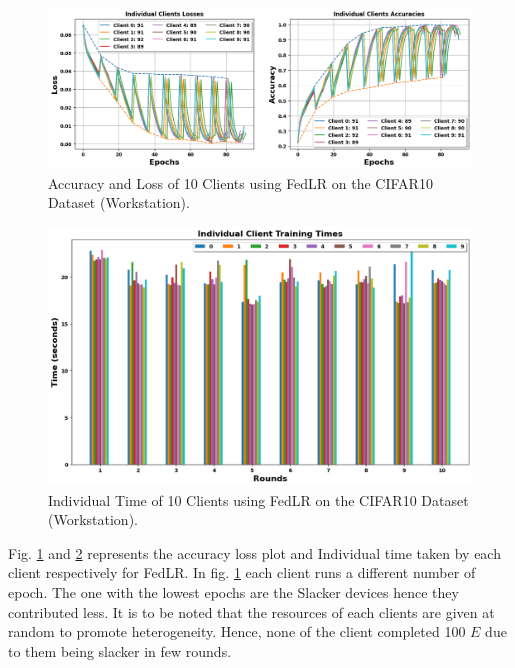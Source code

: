\documentclass[conference]{IEEEtran}
\begin{document}
\begin{figure}[htp!]
	\centering
	\includegraphics[scale=.28]{Images/NEWGRAPHS/1.png}
	\caption{Accuracy and Loss of 10 Clients using FedLR on the CIFAR10 Dataset (Workstation).}
	\label{FedLRC10}
\end{figure}

\begin{figure}[htp!]
	\centering
	\includegraphics[scale=.3]{Images/NEWGRAPHS/2.png}
	\caption{Individual Time of 10 Clients using FedLR on the CIFAR10 Dataset (Workstation).}
	\label{FedLRTimeC10}


\end{figure}
Fig. \ref{FedLRC10} and \ref{FedLRTimeC10} represents the accuracy loss plot and Individual time taken by each client respectively for FedLR. In fig. \ref{FedLRC10} each client runs a different number of epoch. The one with the lowest epochs are the Slacker devices hence they contributed less. It is to be noted that the resources of each clients are given at random to promote heterogeneity. Hence, none of the client completed 100 $E$ due to them being slacker in few rounds.
\end{document}

